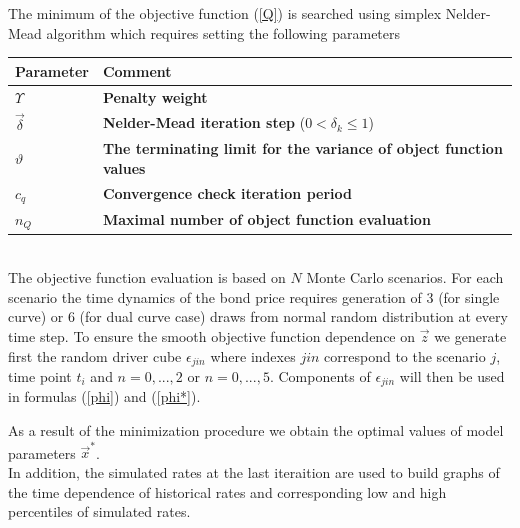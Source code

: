 \documentclass[10pt]{article}
\begin{document}
The minimum of the objective function (\ref{Q}) is searched using simplex Nelder-Mead algorithm which requires setting the following parameters


\begin{tabular}{ |l | l |}
\hline
Parameter  &  Comment \\
\hline
$\Upsilon$ & \textbf{Penalty weight}  \\
$\vec \delta$ & \textbf{Nelder-Mead iteration step }($0 < \delta_k \leq 1$) \\
$\vartheta $ & \textbf{The terminating limit for the variance of object function values}  \\
$c_q$ & \textbf{Convergence check iteration period} \\
$n_Q$ & \textbf{Maximal number of object function evaluation} \\
\hline	
\end{tabular}
\\ 

The objective function evaluation is based on $N$ Monte Carlo scenarios. For each scenario the time dynamics of the bond price requires generation of 3 (for single curve) or 6 (for dual curve case) draws from normal random distribution at every time step. To ensure the smooth objective function dependence on $\vec z$ we generate first the random driver cube $\epsilon_{jin}$ where indexes $jin$ correspond to the scenario $j$, time point $t_i$ and $n=0,...,2$ or $n=0,...,5$. Components of $\epsilon_{jin}$ will then be used in formulas (\ref{phi}) and (\ref{phi*}).

As a result of the minimization procedure we obtain the optimal values of model parameters $ \vec x ^* $. 
~~\\
In addition, the simulated rates at the last iteraition are used to build graphs of the time dependence of historical rates and corresponding low and high percentiles of simulated rates. 
~\\
\end{document}
